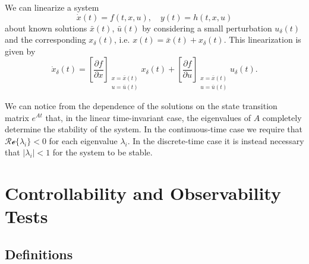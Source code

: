 \documentclass{report}
\begin{document}
We can linearize a system
$$
\dot{x}(t) = f(t, x, u), \quad
y(t) = h(t, x, u)
$$
about known solutions $\bar{x}(t)$,
$\bar{u}(t)$ by considering a small perturbation $u_\delta(t)$ and the
corresponding $x_\delta(t)$, i.e.
$x(t) = \bar{x}(t) + x_\delta(t)$. This linearization is given by
$$
\dot{x}_\delta(t) =
\left[\frac{\partial f}{\partial x}\right]
  _{\substack{x = \bar{x}(t) \\ u = \bar{u}(t)}}
x_\delta(t)
+
\left[\frac{\partial f}{\partial u}\right]
  _{\substack{x = \bar{x}(t) \\ u = \bar{u}(t)}}
u_\delta(t).
$$

We can notice from the dependence of the solutions on
the state transition matrix $e^{At}$ that, in the linear
time-invariant case, the eigenvalues of $A$
completely determine the stability of the system. In the
continuous-time case we require that
$\mathcal{Re}\{\lambda_i\} < 0$ for each eigenvalue $\lambda_i$. In
the discrete-time case it is instead necessary that
$|\lambda_i| < 1$ for the system to be stable.

\section{Controllability and Observability Tests}

\subsection{Definitions}
\end{document}
